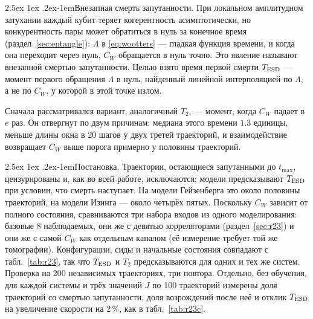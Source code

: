 \documentclass[12pt,a4paper]{report}
\makeatletter
\renewcommand\paragraph{\@startsection{paragraph}{4}{\z@}%
  {2.5ex \@plus1ex \@minus.2ex}{-1em}{\normalfont\normalsize\bfseries}}
\numberwithin{equation}{chapter}
\makeatother
\begin{document}
\paragraph{Внезапная смерть запутанности.} При локальном амплитудном
затухании каждый кубит теряет когерентность асимптотически, но
конкурентность пары может обратиться в нуль за конечное время
(раздел~\ref{sec:entangle}): $\Lambda$ в \eqref{eq:wootters} --- гладкая функция
времени, и когда она переходит через нуль, $C_W$ обращается в нуль точно.
Это явление называют внезапной смертью запутанности. Целью взято время
первой смерти $T_{\rm ESD}$ --- момент первого обращения $\Lambda$ в нуль,
найденный линейной интерполяцией по $\Lambda$, а не по $C_W$, у которой в
этой точке излом.

Сначала рассматривался вариант, аналогичный $T_2$, --- момент, когда $C_W$
падает в $e$ раз. Он отвергнут по двум причинам: медиана этого времени
$1.3$ единицы, меньше длины окна в 20 шагов у двух третей траекторий, и
взаимодействие возвращает $C_W$ выше порога примерно у половины
траекторий.

\paragraph{Постановка.} Траектории, остающиеся запутанными до
$t_{\max}$, цензурированы и, как во всей работе, исключаются; модели
предсказывают $T_{\rm ESD}$ при условии, что смерть наступает. На модели
Гейзенберга это около половины траекторий, на модели Изинга --- около
четырёх пятых. Поскольку $C_W$ зависит от полного состояния, сравниваются
три набора входов из одного моделирования: базовые 8 наблюдаемых, они же с
девятью корреляторами (раздел~\ref{sec:r23}) и они же с самой $C_W$ как
отдельным каналом (её измерение требует той же томографии). Конфигурации,
сиды и начальные состояния совпадают с табл.~\ref{tab:r23}, так что
$T_{\rm ESD}$ и $T_2$ предсказываются для одних и тех же систем. Проверка на
200 независимых траекториях, три повтора. Отдельно, без обучения, для
каждой системы и трёх значений $J$ по 100 траекторий измерены доля
траекторий со смертью запутанности, доля возрождений после неё и отклик
$T_{\rm ESD}$ на увеличение скорости на 2\,\%, как в табл.~\ref{tab:r23c}.
\end{document}
